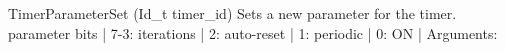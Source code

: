 \subsection{}
\label{func:}
\begin{pdfunction}
{TimerParameterSet (Id\_t timer\_id) }
{ 
Sets a new parameter for the timer. 
parameter bits | 7-3: iterations | 2: auto-reset | 1: periodic | 0: ON | 
Arguments:}
\end{pdfunction}
